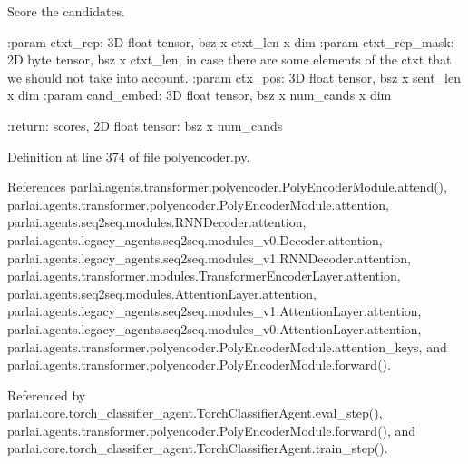 \begin{DoxyVerb}Score the candidates.

:param ctxt_rep:
    3D float tensor, bsz x ctxt_len x dim
:param ctxt_rep_mask:
    2D byte tensor, bsz x ctxt_len, in case there are some elements
    of the ctxt that we should not take into account.
:param ctx_pos: 3D float tensor, bsz x sent_len x dim
:param cand_embed: 3D float tensor, bsz x num_cands x dim

:return: scores, 2D float tensor: bsz x num_cands
\end{DoxyVerb}
 

Definition at line 374 of file polyencoder.\+py.



References parlai.\+agents.\+transformer.\+polyencoder.\+Poly\+Encoder\+Module.\+attend(), parlai.\+agents.\+transformer.\+polyencoder.\+Poly\+Encoder\+Module.\+attention, parlai.\+agents.\+seq2seq.\+modules.\+R\+N\+N\+Decoder.\+attention, parlai.\+agents.\+legacy\+\_\+agents.\+seq2seq.\+modules\+\_\+v0.\+Decoder.\+attention, parlai.\+agents.\+legacy\+\_\+agents.\+seq2seq.\+modules\+\_\+v1.\+R\+N\+N\+Decoder.\+attention, parlai.\+agents.\+transformer.\+modules.\+Transformer\+Encoder\+Layer.\+attention, parlai.\+agents.\+seq2seq.\+modules.\+Attention\+Layer.\+attention, parlai.\+agents.\+legacy\+\_\+agents.\+seq2seq.\+modules\+\_\+v1.\+Attention\+Layer.\+attention, parlai.\+agents.\+legacy\+\_\+agents.\+seq2seq.\+modules\+\_\+v0.\+Attention\+Layer.\+attention, parlai.\+agents.\+transformer.\+polyencoder.\+Poly\+Encoder\+Module.\+attention\+\_\+keys, and parlai.\+agents.\+transformer.\+polyencoder.\+Poly\+Encoder\+Module.\+forward().



Referenced by parlai.\+core.\+torch\+\_\+classifier\+\_\+agent.\+Torch\+Classifier\+Agent.\+eval\+\_\+step(), parlai.\+agents.\+transformer.\+polyencoder.\+Poly\+Encoder\+Module.\+forward(), and parlai.\+core.\+torch\+\_\+classifier\+\_\+agent.\+Torch\+Classifier\+Agent.\+train\+\_\+step().

